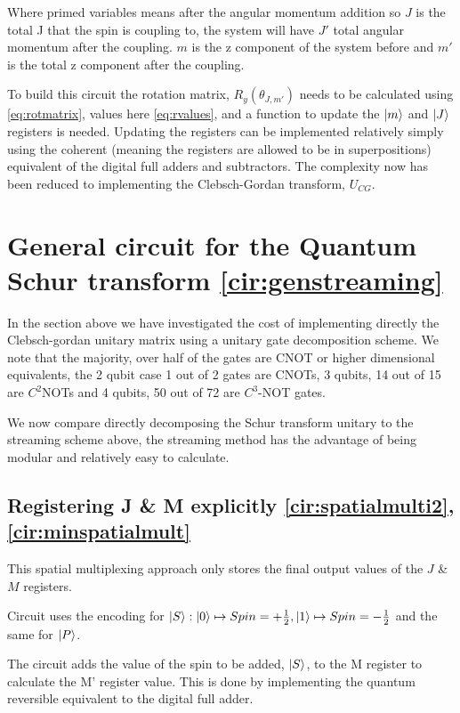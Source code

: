 \documentclass[12pt]{article}
\begin{document}
Where primed variables means after the angular momentum addition so $J$ is the total J that the spin is coupling to, the system will have $J'$ total angular momentum after the coupling. $m$ is the z component of the system before and $m'$ is the total z component after the coupling.

To build this circuit the rotation matrix, $R_y(\theta_{J,m'})$ needs to be calculated using \autoref{eq:rotmatrix}, values here \autoref{eq:rvalues}, and a function to update the $\left\vert{m}\right\rangle$ and $\left\vert{J}\right\rangle$ registers is needed. Updating the registers can be implemented relatively simply using the coherent (meaning the registers are allowed to be in superpositions) equivalent of the digital full adders and subtractors. The complexity now has been reduced to implementing the Clebsch-Gordan transform, $U_{CG}$.




\section{General circuit for the Quantum Schur transform \autoref{cir:genstreaming}}

In the section above we have investigated the cost of implementing directly the Clebsch-gordan unitary matrix using a unitary gate decomposition scheme. We note that the majority, over half of the gates are CNOT or higher dimensional equivalents, the 2 qubit case 1 out of 2 gates are CNOTs, 3 qubits, 14 out of 15 are $C^2$NOTs and 4 qubits, 50 out of 72 are $C^3$-NOT gates. 

We now compare directly decomposing the Schur transform unitary to the streaming scheme above, the streaming method has the advantage of being modular and relatively easy to calculate.  

\subsection{Registering J \& M explicitly \autoref{cir:spatialmulti2}, \autoref{cir:minspatialmult}}

This spatial multiplexing approach only stores the final output values of the $J$ \& $M$ registers. 


Circuit uses the encoding for $\left\vert{S}\right\rangle : \left\vert{0}\right\rangle \mapsto Spin = +\frac{1}{2}, \left\vert{1}\right\rangle \mapsto Spin = -\frac{1}{2}$ and the same for $\left\vert{P}\right\rangle$. 

The circuit adds the value of the spin to be added, $\left\vert{S}\right\rangle$, to the M register to calculate the M' register value. This is done by implementing the quantum reversible equivalent to the digital full adder. 
\end{document}
